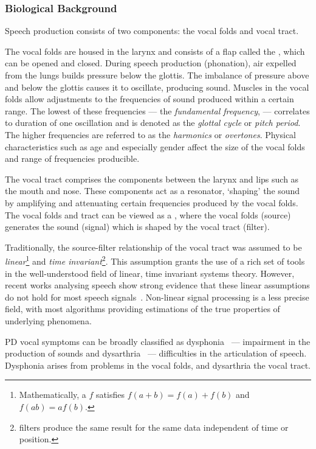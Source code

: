 \documentclass[12pt, twoside]{book}
\renewcommand\emph[1]{\textit{\color{USred}{#1}}}
\begin{document}
\subsubsection{Biological Background}
\label{speechbio}
Speech production consists of two components: the vocal folds and vocal tract. 

The vocal folds are housed in the larynx and consists of a flap called the \emph{glottis}, which can be opened and closed. During speech production (phonation), air expelled from the lungs builds pressure below the glottis. The imbalance of pressure above and below the glottis causes it to oscillate, producing sound. Muscles in the vocal folds allow adjustments to the frequencies of sound produced within a certain range. The lowest of these frequencies --- the \textit{fundamental frequency}, \emph{$f_0$} --- correlates to duration of one oscillation and is denoted as the \textit{glottal cycle} or \textit{pitch period}. The higher frequencies are referred to as the \textit{harmonics} or \textit{overtones}. Physical characteristics such as age and especially gender affect the size of the vocal folds and range of frequencies producible. 

The vocal tract comprises the components between the larynx and lips such as the mouth and nose. These components act as a resonator, `shaping' the sound by amplifying and attenuating certain frequencies produced by the vocal folds. The vocal folds and tract can be viewed as a \emph{source-filter model}, where the vocal folds (source) generates the sound (signal) which is shaped by the vocal tract (filter). 


Traditionally, the source-filter relationship of the vocal tract was assumed to be \textit{linear}\footnote{Mathematically, a \emph{linear function} $f$ satisfies $f(a+b) = f(a) + f(b)$ and $f(ab) = af(b)$.} and \textit{time invariant}\footnote{\emph{Time invariant} filters produce the same result for the same data independent of time or position.}. This assumption grants the use of a rich set of tools in the well-understood field of linear, time invariant systems theory. However, recent works analysing speech show strong evidence that these linear assumptions do not hold for most speech signals~\cite{nonlineardisorder, little2007biomechanically,titze2008nonlinear}. Non-linear signal processing is a less precise field, with most algorithms providing estimations of the true properties of underlying phenomena. 


PD vocal symptoms can be broadly classified as dysphonia~\cite{spworkshoptitze} --- impairment in the production of sounds and dysarthria~\cite{rosen2006parametric} --- difficulties in the articulation of speech. Dysphonia arises from problems in the vocal folds, and dysarthria the vocal tract. 
\end{document}
